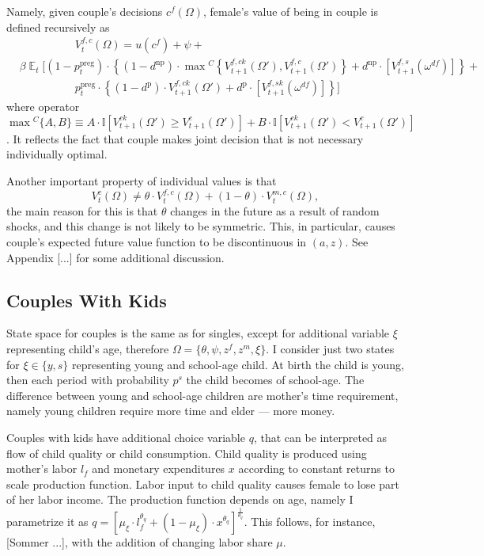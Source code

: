 \documentclass[12pt,letter]{article}
\DeclareMathOperator{\E}{\mathbb{E}}
\newcommand{\I}{\mathbb{I}}
\begin{document}
Namely, given couple's decisions $c^f(\Omega)$, female's value of being in couple is defined recursively as
\begin{align}
& \hspace{5em}  V^{f,c}_t(\Omega) =    u(c^f) + \psi +  \\   \nonumber
 &  \beta \E_t \Big[   (1 - p^{\text{preg}}_t)\cdot \left\{ (1-d^{\text{np}})\cdot \max{}^C \left\{ V^{f,ck}_{t+1}(\Omega'),V^{f,c}_{t+1}(\Omega')\right\} + d^{\text{np}}\cdot [ V_{t+1}^{f,s}(\omega^{df})]\right\}  +  \\  \nonumber
& \hspace{5em} p^{\text{preg}}_t\cdot \left\{ (1-d^{\text{p}})\cdot V^{f,ck}_{t+1}(\Omega') + d^{\text{p}}\cdot [ V_{t+1}^{f,sk}(\omega^{df}) ]\right\} \Big] 
\end{align}
where operator $\max{}^C\{A,B\} \equiv A\cdot \I[V^{ck}_{t+1}(\Omega')\geq V^{c}_{t+1}(\Omega')] + B\cdot \I[V^{ck}_{t+1}(\Omega')< V^{c}_{t+1}(\Omega')]$. It reflects the fact that couple makes joint decision that is not necessary individually optimal.

Another important property of individual values is that
\begin{equation} V^{c}_t(\Omega) \neq \theta\cdot V^{f,c}_t(\Omega) + (1-\theta)\cdot V^{m,c}_t(\Omega),\label{tht_noneq}\end{equation}
the main reason for this is that $\theta$ changes in the future as a result of random shocks, and this change is not likely to be symmetric. This, in particular, causes couple's expected future value function to be discontinuous in $(a,z)$. See Appendix [...] for some additional discussion.

\subsection{Couples With Kids}
State space for couples is the same as for singles, except for additional variable $\xi$ representing child's age, therefore $\Omega = \{\theta,\psi,z^f,z^m,\xi\}$. I consider just two states for $\xi \in \{y,s\}$ representing young and school-age child. At birth the child is young, then each period with probability $p^{s}$ the child becomes of school-age. The difference between young and school-age children are mother's time requirement, namely young children require more time and elder --- more money.

Couples with kids have additional choice variable $q$, that can be interpreted as flow of child quality or child consumption. Child quality is produced using mother's labor $l_f$ and monetary expenditures $x$ according to constant returns to scale production function. Labor input to child quality causes female to lose part of her labor income. The production function depends on age, namely I parametrize it as $q = [\mu_\xi\cdot l_f^{\theta_q} + (1-\mu_\xi)\cdot x^{\theta_q}]^{\frac1{\theta_q}}$. This follows, for instance, [Sommer ...], with the addition of changing labor share $\mu$.
\end{document}
